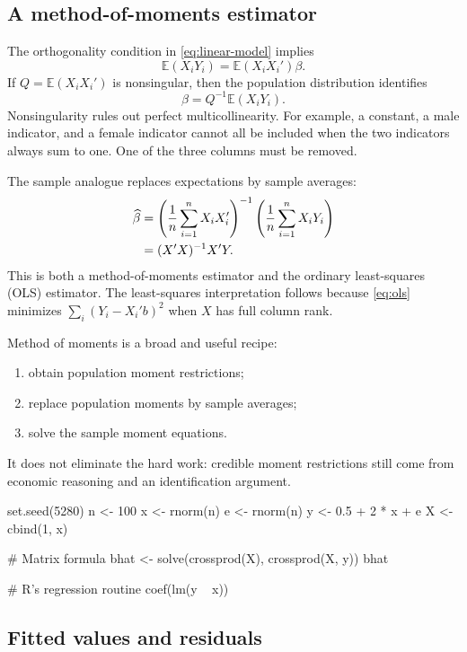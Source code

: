 \subsection{A method-of-moments estimator}

The orthogonality condition in \eqref{eq:linear-model} implies
\[
  \mathbb E(X_iY_i)=\mathbb E(X_iX_i')\beta.
\]
If $Q=\mathbb E(X_iX_i')$ is nonsingular, then the population distribution
identifies
\begin{equation}
\label{eq:beta-population}
  \beta=Q^{-1}\mathbb E(X_iY_i).
\end{equation}
Nonsingularity rules out perfect multicollinearity.  For example, a constant,
a male indicator, and a female indicator cannot all be included when the two
indicators always sum to one.  One of the three columns must be removed.

The sample analogue replaces expectations by sample averages:
\begin{align}
\widehat\beta
  &=\left(\frac1n\sum_{i=1}^{n}X_iX_i'\right)^{-1}
    \left(\frac1n\sum_{i=1}^{n}X_iY_i\right) \notag\\
  &=(X'X)^{-1}X'Y. \label{eq:ols}
\end{align}
This is both a method-of-moments estimator and the ordinary least-squares
(OLS) estimator.  The least-squares interpretation follows because
\eqref{eq:ols} minimizes
$\sum_i(Y_i-X_i'b)^2$ when $X$ has full column rank.

Method of moments is a broad and useful recipe:
\begin{enumerate}
  \item obtain population moment restrictions;
  \item replace population moments by sample averages;
  \item solve the sample moment equations.
\end{enumerate}
It does not eliminate the hard work: credible moment restrictions still come
from economic reasoning and an identification argument.

\begin{rcode}
set.seed(5280)
n <- 100
x <- rnorm(n)
e <- rnorm(n)
y <- 0.5 + 2 * x + e
X <- cbind(1, x)

# Matrix formula
bhat <- solve(crossprod(X), crossprod(X, y))
bhat

# R's regression routine
coef(lm(y ~ x))
\end{rcode}

\subsection{Fitted values and residuals}

